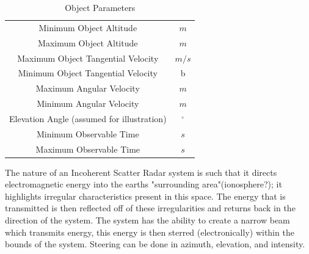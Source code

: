 \documentclass[11pt]{witseiepaper}
\begin{document}
\begin{table}
    \begin{center}
        \begin{tabular}{ c c }
            \hline 
            Minimum Object Altitude & $m$ \\
            Maximum Object Altitude & $m$ \\
            Maximum Object Tangential Velocity & $m/s$ \\
            Minimum Object Tangential Velocity & b \\
            Maximum Angular Velocity & $m$ \\
            Minimum Angular Velocity & $m$ \\
            Elevation Angle (assumed for illustration) & $^{\circ}$ \\
            Minimum Observable Time & $s$ \\
            Maximum Observable Time & $s$ \\
        \end{tabular}
        \caption{Object Parameters}
        \label{tab:ObjectParameters}
    \end{center}
\end{table}


The nature of an Incoherent Scatter Radar system is such that it directs electromagnetic energy into the earths "surrounding area"(ionosphere?); it highlights irregular characteristics present in this space. The energy that is transmitted is then reflected off of these irregularities and returns back in the direction of the system.
The system has the ability to create a narrow beam which transmits energy, this energy is then sterred (electronically) within the bounds of the system. Steering can be done in azimuth, elevation, and intensity. 
\end{document}
